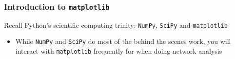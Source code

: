 \documentclass[xcolor=dvipsnames, 9pt]{beamer}
\begin{document}
\begin{frame}[fragile]
    \frametitle{Introduction to \texttt{matplotlib}}
    Recall Python's scientific computing trinity: \texttt{NumPy}, \texttt{SciPy} and \texttt{matplotlib}
    \begin{itemize}
        \item While \texttt{NumPy} and \texttt{SciPy} do most of the behind the scenes work, you will interact with \texttt{matplotlib} frequently for when doing network analysis
    \end{itemize}
    \begin{columns}
        \begin{enumerate}
        \end{enumerate}
    \end{columns}
\end{frame}
\end{document}
